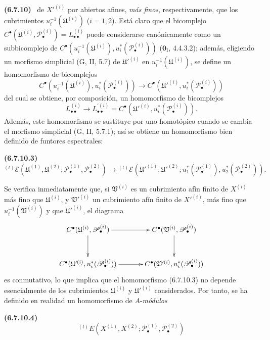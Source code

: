\documentclass[10pt,oneside]{book}
\newcommand{\oldpage}[2][]{\setcounter{footnote}{0}\marginpar{\scriptsize\textbf{#1}~|~#2}\ignorespaces}
\newenvironment{env}[1][]{\par\medskip\noindent\textbf{(#1)}\ }{\par}
\begin{document}
\begin{env}[6.7.10]
\oldpage[III]{163}
de $X'^{(i)}$ por abiertos afines, \emph{más finos}, respectivamente, que los
cubrimientos $u_i^{-1}(\mathfrak U^{(i)})$ ($i=1,2$). Está claro que el
bicomplejo
$C^\bullet(\mathfrak U^{(i)},\mathscr P_\bullet^{(i)})
=L_{\bullet\bullet}^{(i)}$ puede considerarse canónicamente como un
subbicomplejo de
$C^\bullet(u_i^{-1}(\mathfrak U^{(i)}),u_i^*(\mathscr P_\bullet^{(i)}))$
($\mathbf{0}_{\mathrm I}$, 4.4.3.2); además, eligiendo un morfismo simplicial
(G, II, 5.7) de $\mathfrak U'^{(i)}$ en
$u_i^{-1}(\mathfrak U^{(i)})$, se define un homomorfismo de bicomplejos
\[
  C^\bullet(u_i^{-1}(\mathfrak U^{(i)}),u_i^*(\mathscr P_\bullet^{(i)}))
  \longrightarrow
  C^\bullet(\mathfrak U'^{(i)},u_i^*(\mathscr P_\bullet^{(i)}))
\]
del cual se obtiene, por composición, un homomorfismo de bicomplejos
\[
  L_{\bullet\bullet}^{(i)}
  \longrightarrow
  L_{\bullet\bullet}^{\prime(i)}
  =C^\bullet(\mathfrak U'^{(i)},u_i^*(\mathscr P_\bullet^{(i)})).
\]
Además, este homomorfismo se sustituye por uno homotópico cuando se cambia el
morfismo simplicial (G, II, 5.7.1); así se obtiene un homomorfismo bien
definido de funtores espectrales:
\begin{env}[6.7.10.3]
\label{III.6.7.10.3}
\[
  {}^{(t)}\mathscr E
  (\mathfrak U^{(1)},\mathfrak U^{(2)};
   \mathscr P_\bullet^{(1)},\mathscr P_\bullet^{(2)})
  \longrightarrow
  {}^{(t)}\mathscr E
  (\mathfrak U'^{(1)},\mathfrak U'^{(2)};
   u_1^*(\mathscr P_\bullet^{(1)}),u_2^*(\mathscr P_\bullet^{(2)})).
  \tag{6.7.10.3}\label{III.6.7.10.3.eq}
\]
\end{env}
Se verifica inmediatamente que, si $\mathfrak V^{(i)}$ es un cubrimiento
afín finito de $X^{(i)}$ más fino que $\mathfrak U^{(i)}$, y
$\mathfrak V'^{(i)}$ un cubrimiento afín finito de $X'^{(i)}$, más fino que
$u_i^{-1}(\mathfrak V^{(i)})$ y que $\mathfrak U'^{(i)}$, el diagrama
\[
\xymatrix@C=34pt@R=30pt{
  C^\bullet(\mathfrak U^{(i)},\mathscr P_\bullet^{(i)})
  \ar[r]\ar[d]
  & C^\bullet(\mathfrak V^{(i)},\mathscr P_\bullet^{(i)})\ar[d]
  \\
  C^\bullet(\mathfrak U'^{(i)},u_i^*(\mathscr P_\bullet^{(i)}))
  \ar[r]
  & C^\bullet(\mathfrak V'^{(i)},u_i^*(\mathscr P_\bullet^{(i)}))
}
\]
es conmutativo, lo que implica que el homomorfismo (6.7.10.3) no depende
esencialmente de los cubrimientos $\mathfrak U^{(i)}$ y
$\mathfrak U'^{(i)}$ considerados. Por tanto, se ha definido en realidad un
homomorfismo de $A$-\emph{módulos}
\begin{env}[6.7.10.4]
\label{III.6.7.10.4}
\[
  {}^{(t)}E
  (X^{(1)},X^{(2)};\mathscr P_\bullet^{(1)},\mathscr P_\bullet^{(2)})
\]
\end{env}
\end{env}
\end{document}
